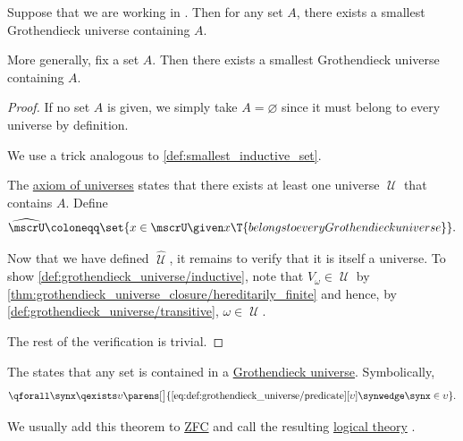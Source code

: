 \begin{proposition}\label{thm:smallest_grothendieck_universe_existence}
  Suppose that we are working in . Then for any set \( A \), there exists a smallest Grothendieck universe containing \( A \).

  More generally, fix a set \( A \). Then there exists a smallest Grothendieck universe containing \( A \).
\end{proposition}
\begin{proof}
  If no set \( A \) is given, we simply take \( A = \varnothing \) since it must belong to every universe by definition.

  We use a trick analogous to \cref{def:smallest_inductive_set}.

  The \hyperref[def:axiom_of_universes]{axiom of universes} states that there exists at least one universe \( \mscrU \) that contains \( A \). Define
  \begin{equation*}
    \widehat \mscrU \coloneqq \set{ x \in \mscrU \given x \T{belongs to every Grothendieck universe} }.
  \end{equation*}

  Now that we have defined \( \widehat \mscrU \), it remains to verify that it is itself a universe. To show \ref{def:grothendieck_universe/inductive}, note that \( V_\omega \in \mscrU \) by \cref{thm:grothendieck_universe_closure/hereditarily_finite} and hence, by \ref{def:grothendieck_universe/transitive}, \( \omega \in \mscrU \).

  The rest of the verification is trivial.
\end{proof}

\begin{definition}\label{def:axiom_of_universes}
  The  states that any set is contained in a \hyperref[def:grothendieck_universe]{Grothendieck universe}. Symbolically,
  \begin{equation}\label{eq:def:axiom_of_universes}
    \begin{aligned}
      \qforall \synx \qexists \upsilon \parens[\big]{ \ref{eq:def:grothendieck_universe/predicate}[\upsilon] \synwedge \synx \in \upsilon }.
    \end{aligned}
  \end{equation}

  We usually add this theorem to \hyperref[def:zfc]{ZFC} and call the resulting \hyperref[def:fol_theory]{logical theory} .
\end{definition}

